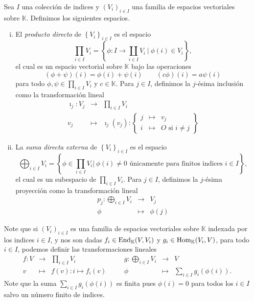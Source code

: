\begin{defn}\label{productoysuma}
Sea $I$ una colecci\'on de indices y $\left(V_i\right)_{i\in I}$ una familia de espacios vectoriales sobre $\mathbb{K}$. Definimos los siguientes espacios.
\begin{enumerate}[(i)]
\item El \emph{producto directo} de $\left\{V_i\right\}_{i\in I}$ es el espacio
\[
\prod_{i\in I} V_i=\left\{\phi: I\rightarrow \coprod_{i\in I}V_i\ \Big|\ \phi(i)\in V_i\right\},
\]
el cual es un espacio vectorial sobre $\mathbb{K}$ bajo las operaciones
\[
(\phi+\psi)(i)=\phi(i)+\psi(i)\qquad (c\phi)(i)=a\psi(i)
\]
para todo $\phi,\psi\in \prod_{i\in I} V_i$ y $c\in \mathbb{K}$. Para $j\in I$, definimos la $j$-ésima inclusión como la transformación lineal
\begin{eqnarray*}
  \imath_j: V_j & \longrightarrow &\prod_{i\in I} V_i\\
    v_j & \longmapsto & \imath_j(v_j):\left\{\begin{array}{rcl}
                                              j& \mapsto & v_j\\
                                              i& \mapsto & O\text{ si } i\ne j
                                            \end{array}\right\}
\end{eqnarray*}
\item La \emph{suma directa externa} de $\left\{V_i\right\}_{i\in I}$ es el espacio
\[
\bigoplus_{i\in I} V_i=\left\{\phi\in \prod_{i\in I} V_i \Big|\ \phi(i)\ne 0\textrm{ \'unicamente para finitos indices } i\in I\right\},
\]
el cual es un subespacio de $\prod_{i\in I} V_i$. Para $j\in I$, definimos la $j$-ésima proyección como la transformación lineal
\begin{eqnarray*}
  p_j: \bigoplus_{i\in I} V_i & \longrightarrow & V_j\\
    \phi & \longmapsto & \phi(j)
\end{eqnarray*}
\end{enumerate} 
\end{defn}

\begin{obs}\label{propiedaduniversalproductoysuma}
Note que si $\left(V_i\right)_{i\in I}$ es una familia de espacios vectoriales sobre $\mathbb{K}$ indexada por los indices $i\in I$, y nos son dadas $f_i\in\operatorname{End}_\mathbb{K}(V,V_i)$ y $g_i\in\operatorname{Hom}_\mathbb{K}(V_i,V)$, para todo $i\in I$, podemos definir las transformaciones lineales
\[
\begin{array}{rclcrcl}
f:V& \longrightarrow & \prod_{i\in I} V_i &\quad& g: \bigoplus_{i\in I} V_i & \longrightarrow & V \\
  v & \longmapsto & f(v):i\mapsto f_i(v) &\quad& \phi & \longmapsto & \sum_{i\in I} g_i\left(\phi(i)\right). 
\end{array}
\]
Note que la suma $\sum_{i\in I} g_i\left(\phi(i)\right)$ es finita pues $\phi(i)=0$ para todos los $i\in I$ salvo un n\'umero finito de indices.
\end{obs}

